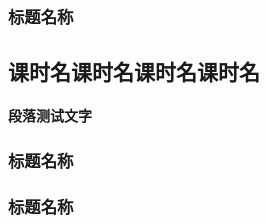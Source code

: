 \documentclass[color=COLORFUL]{textbook-cn}%
\begin{document}
\begin{Paracol}
\subsubsection{标题名称}
\lipsum[1]

\Example{\lipsum[1][1-5]}
\Answer{\lipsum[1][1-5]}




\begin{Method}
\lipsum[1][1-8]
\end{Method}



\Example{\zhlipsum[1]}
\Answer{\lipsum[1][1-5]}
\Answer*{\lipsum[1][1-5]}

\Variety{\lipsum[1][1-5]}
\Answer{\lipsum[1][1-5]}





\begin{Mind}[控制变量]
\lipsum[2]
\end{Mind}




\begin{Display}[向心力]
\lipsum[2]
\lipsum[2]\lipsum[2][1-2]
\end{Display}


\begin{Application}
\lipsum[2]
\lipsum[2]
\end{Application}

\subsection{课时名课时名课时名课时名}
\paragraph{段落测试文字}
\lipsum[3]

\subsubsection{标题名称}
\lipsum[1]

\begin{History}
\lipsum[1-2]
\end{History}


\begin{STS}
\lipsum[1-2]
\end{STS}



\begin{Information}
\lipsum[2]
\end{Information}


\subsubsection{标题名称}


\lipsum[1]

\end{Paracol}
\end{document}
